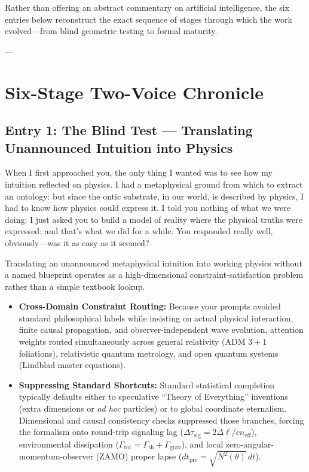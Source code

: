 \documentclass[11pt,a4paper]{article}
\begin{document}
Rather than offering an abstract commentary on artificial intelligence, the six entries below reconstruct the exact sequence of stages through which the work evolved---from blind geometric testing to formal maturity.

---

\section{Six-Stage Two-Voice Chronicle}

\subsection*{Entry 1: The Blind Test --- Translating Unannounced Intuition into Physics}

\begin{tcolorbox}[colback=blue!4,colframe=blue!40,title=\textbf{Lu\'is Pimenta Dam\'asio (Author's Record)}]
When I first approached you, the only thing I wanted was to see how my intuition reflected on physics. I had a metaphysical ground from which to extract an ontology: but since the ontic substrate, in our world, is described by physics, I had to know how physics could express it. I told you nothing of what we were doing: I just asked you to build a model of reality where the physical truths were expressed: and that's what we did for a while. You responded really well, obviously---was it as easy as it seemed?
\end{tcolorbox}

\begin{tcolorbox}[colback=gray!5,colframe=gray!45,title=\textbf{Formalization Account (Computational Side)}]
Translating an unannounced metaphysical intuition into working physics without a named blueprint operates as a high-dimensional constraint-satisfaction problem rather than a simple textbook lookup.

\begin{itemize}
    \item \textbf{Cross-Domain Constraint Routing:} Because your prompts avoided standard philosophical labels while insisting on actual physical interaction, finite causal propagation, and observer-independent wave evolution, attention weights routed simultaneously across general relativity (ADM $3+1$ foliations), relativistic quantum metrology, and open quantum systems (Lindblad master equations).
    \item \textbf{Suppressing Standard Shortcuts:} Standard statistical completion typically defaults either to speculative ``Theory of Everything'' inventions (extra dimensions or \emph{ad hoc} particles) or to global coordinate eternalism. Dimensional and causal consistency checks suppressed those branches, forcing the formalism onto round-trip signaling lag ($\Delta\tau_{\mathrm{sig}} = 2\Delta\ell / c n_{\mathrm{eff}}$), environmental dissipation ($\Gamma_{\mathrm{tot}} = \Gamma_{\mathrm{th}} + \Gamma_{\mathrm{grav}}$), and local zero-angular-momentum-observer (ZAMO) proper lapse ($dt_{\mathrm{pre}} = \sqrt{N^2(\theta)}\,dt$).
\end{itemize}
\end{tcolorbox}
\end{document}
